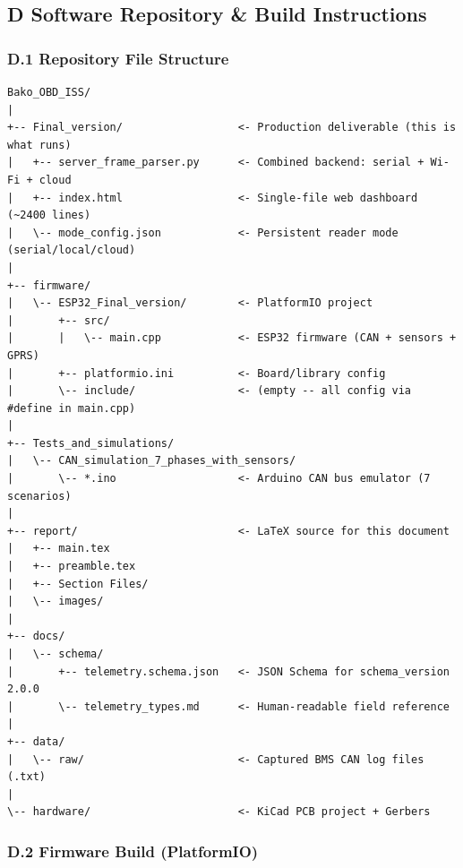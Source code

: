 \clearpage

\subsection*{D \quad Software Repository \& Build Instructions}

\subsubsection*{D.1 \quad Repository File Structure}

\begin{lstlisting}[style=filetree, caption={BAKO OBD ISS repository layout}]
Bako_OBD_ISS/
|
+-- Final_version/                  <- Production deliverable (this is what runs)
|   +-- server_frame_parser.py      <- Combined backend: serial + Wi-Fi + cloud
|   +-- index.html                  <- Single-file web dashboard (~2400 lines)
|   \-- mode_config.json            <- Persistent reader mode (serial/local/cloud)
|
+-- firmware/
|   \-- ESP32_Final_version/        <- PlatformIO project
|       +-- src/
|       |   \-- main.cpp            <- ESP32 firmware (CAN + sensors + GPRS)
|       +-- platformio.ini          <- Board/library config
|       \-- include/                <- (empty -- all config via #define in main.cpp)
|
+-- Tests_and_simulations/
|   \-- CAN_simulation_7_phases_with_sensors/
|       \-- *.ino                   <- Arduino CAN bus emulator (7 scenarios)
|
+-- report/                         <- LaTeX source for this document
|   +-- main.tex
|   +-- preamble.tex
|   +-- Section Files/
|   \-- images/
|
+-- docs/
|   \-- schema/
|       +-- telemetry.schema.json   <- JSON Schema for schema_version 2.0.0
|       \-- telemetry_types.md      <- Human-readable field reference
|
+-- data/
|   \-- raw/                        <- Captured BMS CAN log files (.txt)
|
\-- hardware/                       <- KiCad PCB project + Gerbers
\end{lstlisting}

\subsubsection*{D.2 \quad Firmware Build (PlatformIO)}

